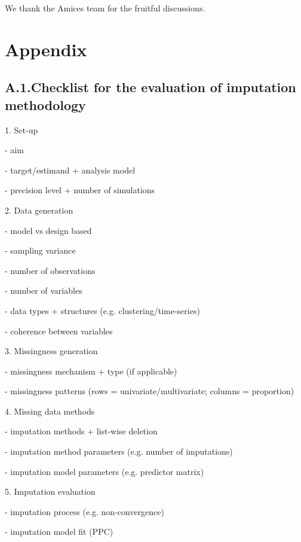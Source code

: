 \documentclass[bimj,fleqn]{w-art}
\begin{document}

\begin{acknowledgement}
We thank the Amices team for the fruitful discussions.
\end{acknowledgement}
\vspace*{1pc}



\section*{Appendix}

\subsection*{A.1.\enspace Checklist for the evaluation of imputation methodology}

1. Set-up

- aim

- target/estimand + analysis model

- precision level + number of simulations

2. Data generation

- model vs design based

- sampling variance

- number of observations

- number of variables

- data types + structures (e.g. clustering/time-series)

- coherence between variables

3. Missingness generation

- missingness mechanism + type (if applicable)

- missingness patterns (rows = univariate/multivariate; columns = proportion)

4. Missing data methods

- imputation methods + list-wise deletion

- imputation method parameters (e.g. number of imputations)

- imputation model parameters (e.g. predictor matrix)

5. Imputation evaluation

- imputation process (e.g. non-convergence)

- imputation model fit (PPC)
\end{document}
